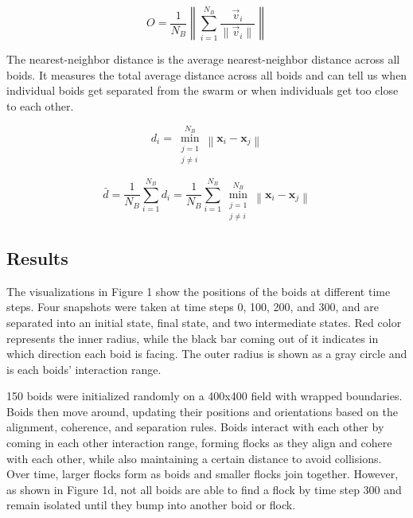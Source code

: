 \documentclass{article}
\begin{document}
\[
O = \frac{1}{N_B} \left\lVert \sum_{i=1}^{N_B} \frac{\vec{v}_i}{\lVert \vec{v}_i \rVert} \right\rVert
\]




The nearest-neighbor distance is the average nearest-neighbor distance across all boids. It measures the total average distance across all boids and can tell us when individual boids get
separated from the swarm or when individuals get too close to each other.



\[
d_i = \min_{\substack{j = 1 \\ j \neq i}}^{N_B} \left\lVert \mathbf{x}_i - \mathbf{x}_j \right\rVert
\]





\[
\bar{d} = \frac{1}{N_B} \sum_{i=1}^{N_B} d_i
        = \frac{1}{N_B} \sum_{i=1}^{N_B}
          \min_{\substack{j = 1 \\ j \neq i}}^{N_B}
          \left\lVert \mathbf{x}_i - \mathbf{x}_j \right\rVert
\]











\subsection{Results}






The visualizations in Figure 1 show the positions of the boids at different time steps. Four snapshots were taken at time steps 0, 100, 200, and 300, and are separated into an initial state, final state, and two intermediate states. Red color represents the inner radius, while the black bar coming out of it indicates in which direction each boid is facing. The outer radius is shown as a gray circle and is each boids' interaction range. 

150 boids were initialized randomly on a 400x400 field with wrapped boundaries. Boids then move around, updating their positions and orientations based on the alignment, coherence, and separation rules. Boids interact with each other by coming in each other interaction range, forming flocks as they align and cohere with each other, while also maintaining a certain distance to avoid collisions. Over time, larger flocks form as boids and smaller flocks join together. However, as shown in Figure 1d, not all boids are able to find a flock by time step 300 and remain isolated until they bump into another boid or flock.
\end{document}
